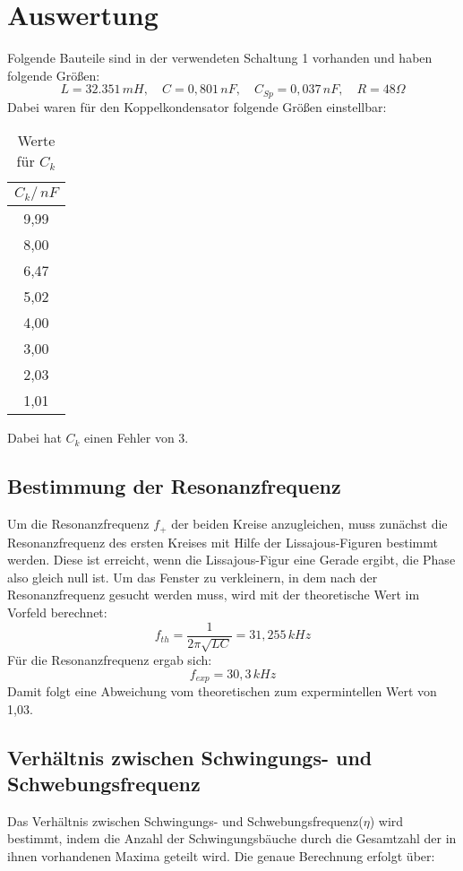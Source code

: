 \section{Auswertung}
\label{sec:Auswertung}

Folgende Bauteile sind in der verwendeten Schaltung 1 vorhanden und haben folgende Größen:
$$
  L = 32.351\,mH, \quad
  C = 0,801\,nF, \quad
  C_{Sp} = 0,037\,nF, \quad
  R = 48 \Omega
$$
Dabei waren für den Koppelkondensator folgende Größen einstellbar:
\begin{table}[!h]
    \centering
    \caption{Werte für $C_k$}
    \begin{tabular}{c}
      \toprule
      $C_k/\,nF$ \\
      \midrule
      9,99 \\
      8,00 \\
      6,47 \\
      5,02 \\
      4,00 \\
      3,00 \\
      2,03 \\
      1,01 \\
      \bottomrule
    \end{tabular}
\end{table}

Dabei hat $C_k$ einen Fehler von 3\text{\%}.

\subsection{Bestimmung der Resonanzfrequenz}

Um die Resonanzfrequenz $f_+$ der beiden Kreise anzugleichen, muss zunächst die Resonanzfrequenz des
ersten Kreises mit Hilfe der Lissajous-Figuren bestimmt werden. Diese ist erreicht, wenn
die Lissajous-Figur eine Gerade ergibt, die Phase also gleich null ist.
Um das Fenster zu verkleinern, in dem nach der Resonanzfrequenz gesucht werden muss, wird mit der theoretische Wert
im Vorfeld berechnet:
$$
  f_{th} = \frac{1}{2 \pi \sqrt{LC}} = 31,255\,kHz
$$
Für die Resonanzfrequenz ergab sich:
$$
  f_{exp} = 30,3\,kHz
$$
Damit folgt eine Abweichung vom theoretischen zum expermintellen Wert von 1,03\text{\%}.
\subsection{Verhältnis zwischen Schwingungs- und Schwebungsfrequenz}
\label{sec:vss}

Das Verhältnis zwischen Schwingungs- und Schwebungsfrequenz($\eta$) wird bestimmt, indem die Anzahl der Schwingungsbäuche durch die Gesamtzahl der in ihnen
vorhandenen Maxima geteilt wird. Die genaue Berechnung erfolgt über:

